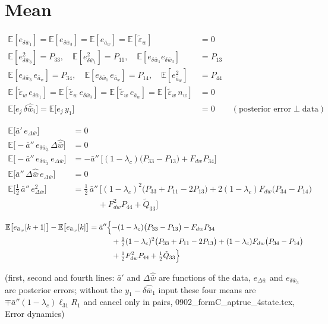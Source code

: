 \documentclass[11pt,a4paper,fontset=none]{ctexart}
\newcommand{\ba}{\bar{a}}
\newcommand{\bw}{\bar{w}}
\newcommand{\E}{\mathbb{E}}
\newcommand{\dWh}{\Delta\hat{\bw}}
\newcommand{\eD}{e_{\Delta\bw}}
\newcommand{\ap}{\ba'}
\newcommand{\app}{\ba''}
\newcommand{\et}{\tilde{\varepsilon}_w}
\begin{document}
\section{Mean}

\begin{align*}
\E[e_{\delta\bw_1}] = \E[e_{\delta\bw_3}] = \E[e_{\ba_w}] = \E[\et] &= 0 \\
\E[e_{\delta\bw_3}^{2}] = P_{33},\quad \E[e_{\delta\bw_1}^{2}] = P_{11},\quad \E[e_{\delta\bw_1}e_{\delta\bw_3}] &= P_{13} \\
\E[e_{\delta\bw_3}\,e_{\ba_w}] = P_{34},\quad \E[e_{\delta\bw_1}\,e_{\ba_w}] = P_{14},\quad \E[e_{\ba_w}^{2}] &= P_{44} \\
\E[\et\,e_{\delta\bw_1}] = \E[\et\,e_{\delta\bw_3}] = \E[\et\,e_{\ba_w}] = \E[\et\,n_w] &= 0 \\
\E\bigl[e_j\,\delta\hat{\bw}_i\bigr] = \E\bigl[e_j\,y_1\bigr] &= 0 \qquad (\text{posterior error} \perp \text{data})
\end{align*}

\begin{align*}
\E\bigl[\ap\,\eD\bigr]                     &= 0 \\
\E\bigl[-\app\,e_{\delta\bw_3}\,\dWh\bigr]  &= 0 \\
\E\bigl[-\app\,e_{\delta\bw_3}\,\eD\bigr]   &= -\app\,\bigl[(1-\lambda_c)\bigl(P_{33} - P_{13}\bigr) + F_{dw}P_{34}\bigr] \\
\E\bigl[\app\,\dWh\,\eD\bigr]               &= 0 \\
\E\bigl[\tfrac{1}{2}\,\app\,\eD^{2}\bigr]   &= \tfrac{1}{2}\,\app\,\bigl[(1-\lambda_c)^{2}\bigl(P_{33} + P_{11} - 2P_{13}\bigr)
   + 2(1-\lambda_c)F_{dw}\bigl(P_{34} - P_{14}\bigr) \\
  &\qquad\quad + F_{dw}^{2}P_{44} + \tilde{Q}_{33}\bigr]
\end{align*}

\begin{align*}
\E\bigl[e_{\ba_w}[k+1]\bigr] - \E\bigl[e_{\ba_w}[k]\bigr]
  &= \app\Bigl\{-(1-\lambda_c)\bigl(P_{33} - P_{13}\bigr) - F_{dw}P_{34} \\
  &\qquad\quad + \tfrac{1}{2}(1-\lambda_c)^{2}\bigl(P_{33} + P_{11} - 2P_{13}\bigr)
     + (1-\lambda_c)F_{dw}\bigl(P_{34} - P_{14}\bigr) \\
  &\qquad\quad + \tfrac{1}{2}F_{dw}^{2}P_{44} + \tfrac{1}{2}\tilde{Q}_{33}\Bigr\}
\end{align*}

(first, second and fourth lines: $\ap$ and $\dWh$ are functions of the data, $\eD$ and $e_{\delta\bw_3}$ are posterior errors;
without the $y_1 - \delta\hat{\bw}_1$ input these four means are $\mp\app(1-\lambda_c)\ell_{31}R_1$ and cancel only in pairs,
0902\_formC\_aptrue\_4state.tex, Error dynamics)
\end{document}
